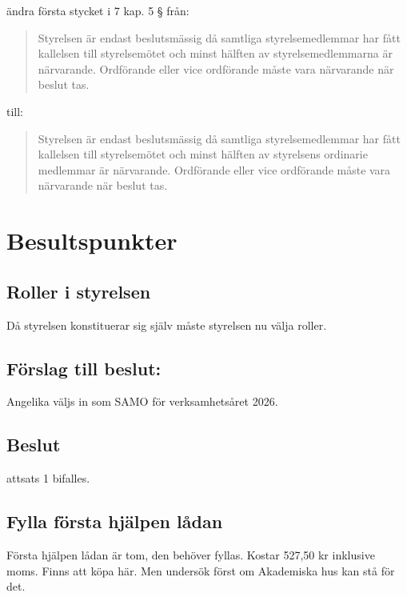 \documentclass[protokoll]{dvd}
\begin{document}
\begin{attsatser}
    \item 
    ändra första stycket i 7 kap. 5 § från:
    \begin{quote}
        Styrelsen är endast beslutsmässig då samtliga styrelsemedlemmar har fått kallelsen till styrelsemötet och minst hälften av styrelsemedlemmarna är närvarande.
        Ordförande eller vice ordförande måste vara närvarande när beslut tas.
    \end{quote}
    till:
    \begin{quote}
        Styrelsen är endast beslutsmässig då samtliga styrelsemedlemmar har fått kallelsen till styrelsemötet och minst hälften av styrelsens ordinarie medlemmar är närvarande.
        Ordförande eller vice ordförande måste vara närvarande när beslut tas.
    \end{quote}
\end{attsatser}

\newpage
\section{Besultspunkter}
\subsection{Roller i styrelsen}
Då styrelsen konstituerar sig själv måste styrelsen nu välja roller.
\subsection*{Förslag till beslut:}
\begin{attsatser}
    \item Angelika väljs in som SAMO för verksamhetsåret 2026.
\end{attsatser}
\subsection*{Beslut}
\begin{attsatser}
    \item attsats 1 bifalles.
\end{attsatser}


\subsection{Fylla första hjälpen lådan}
Första hjälpen lådan är tom, den behöver fyllas. Kostar 527,50 kr inklusive moms. Finns att köpa här.
Men undersök först om Akademiska hus kan stå för det. 
\end{document}
